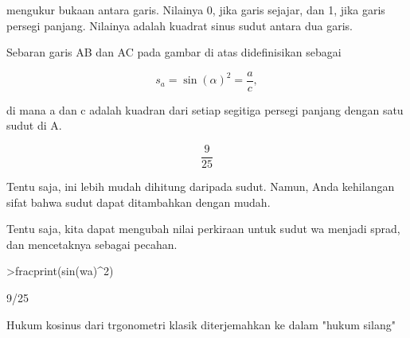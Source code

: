 \documentclass[a4paper,10pt]{article}
\begin{document}
\begin{eulernotebook}
\begin{eulercomment}
\begin{eulercomment}
\begin{eulercomment}
\begin{eulercomment}
\begin{eulercomment}
\begin{eulercomment}
\begin{eulercomment}
\begin{eulercomment}
\begin{eulercomment}
\begin{eulercomment}
\begin{eulercomment}
\begin{eulercomment}
\begin{eulercomment}
\begin{eulercomment}
\begin{eulercomment}
\begin{eulercomment}
\begin{eulercomment}
\begin{eulercomment}
\begin{eulercomment}
\begin{eulercomment}
\begin{eulercomment}
\begin{eulercomment}
\begin{eulercomment}
\begin{eulercomment}
\begin{eulercomment}
\begin{eulercomment}
\begin{eulercomment}
\begin{eulercomment}
\begin{eulercomment}
\begin{eulercomment}
\begin{eulercomment}
\begin{eulercomment}
\begin{eulercomment}
\begin{eulercomment}
\begin{eulercomment}
\begin{eulercomment}
\begin{eulercomment}
\begin{eulercomment}
\begin{eulercomment}
\begin{eulercomment}
\begin{eulercomment}
\begin{eulercomment}
\begin{eulercomment}
\begin{eulercomment}
\begin{eulercomment}
\begin{eulercomment}
\begin{eulercomment}
\begin{eulercomment}
\begin{eulercomment}
\begin{eulercomment}
\begin{eulercomment}
\begin{eulercomment}
\begin{eulercomment}
\begin{eulercomment}
\begin{eulercomment}
\begin{eulercomment}
\begin{eulercomment}
\begin{eulercomment}
\begin{eulercomment}
\begin{eulercomment}
\begin{eulercomment}
\begin{eulercomment}
\begin{eulercomment}
mengukur
bukaan antara garis. Nilainya 0, jika garis sejajar, dan 1, jika garis
persegi panjang. Nilainya adalah kuadrat sinus sudut antara dua garis.

Sebaran garis AB dan AC pada gambar di atas didefinisikan sebagai

\end{eulercomment}
\begin{eulerformula}
\[
s_a = \sin(\alpha)^2 = \frac{a}{c},
\]
\end{eulerformula}
\begin{eulercomment}
di mana a dan c adalah kuadran dari setiap segitiga persegi panjang
dengan satu sudut di A.
\end{eulercomment}
\begin{eulerformula}
\[
\frac{9}{25}
\]
\end{eulerformula}
\begin{eulercomment}
Tentu saja, ini lebih mudah dihitung daripada sudut. Namun, Anda
kehilangan sifat bahwa sudut dapat ditambahkan dengan mudah.

Tentu saja, kita dapat mengubah nilai perkiraan untuk sudut wa menjadi
sprad, dan mencetaknya sebagai pecahan.
\end{eulercomment}
\begin{eulerprompt}
>fracprint(sin(wa)^2)
\end{eulerprompt}
\begin{euleroutput}
  9/25
\end{euleroutput}
\begin{eulercomment}
Hukum kosinus dari trgonometri klasik diterjemahkan ke dalam "hukum
silang" 
\end{eulercomment}
\end{eulercomment}
\end{eulercomment}
\end{eulercomment}
\end{eulercomment}
\end{eulercomment}
\end{eulercomment}
\end{eulercomment}
\end{eulercomment}
\end{eulercomment}
\end{eulercomment}
\end{eulercomment}
\end{eulercomment}
\end{eulercomment}
\end{eulercomment}
\end{eulercomment}
\end{eulercomment}
\end{eulercomment}
\end{eulercomment}
\end{eulercomment}
\end{eulercomment}
\end{eulercomment}
\end{eulercomment}
\end{eulercomment}
\end{eulercomment}
\end{eulercomment}
\end{eulercomment}
\end{eulercomment}
\end{eulercomment}
\end{eulercomment}
\end{eulercomment}
\end{eulercomment}
\end{eulercomment}
\end{eulercomment}
\end{eulercomment}
\end{eulercomment}
\end{eulercomment}
\end{eulercomment}
\end{eulercomment}
\end{eulercomment}
\end{eulercomment}
\end{eulercomment}
\end{eulercomment}
\end{eulercomment}
\end{eulercomment}
\end{eulercomment}
\end{eulercomment}
\end{eulercomment}
\end{eulercomment}
\end{eulercomment}
\end{eulercomment}
\end{eulercomment}
\end{eulercomment}
\end{eulercomment}
\end{eulercomment}
\end{eulercomment}
\end{eulercomment}
\end{eulercomment}
\end{eulercomment}
\end{eulercomment}
\end{eulercomment}
\end{eulercomment}
\end{eulercomment}
\end{eulernotebook}
\end{document}
